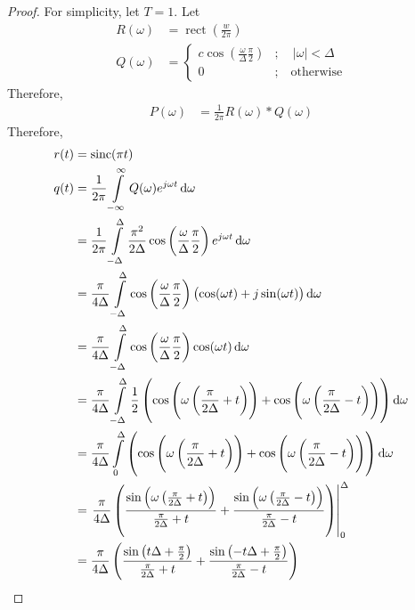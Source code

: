 \documentclass[titlepage, fleqn, a4paper, 12pt, twoside]{article}
\theoremstyle{definition}
\theoremstyle{theorem}
\DeclareMathOperator{\sinc}{\mathrm{sinc}}
\DeclareMathOperator{\rect}{\mathrm{rect}}
\begin{document}
\begin{proof}
	For simplicity, let $T = 1$.
	Let
	\begin{align*}
		R(\omega) &= \rect\left( \frac{w}{2 \pi} \right)\\
		Q(\omega) &=
			\begin{cases}
				c \cos\left( \frac{\omega}{\Delta} \frac{\pi}{2} \right) &;\quad |\omega| < \Delta\\
				0 &;\quad \text{otherwise}
			\end{cases}
	\end{align*}
	Therefore,
	\begin{align*}
		P(\omega) &= \frac{1}{2 \pi} R(\omega) \ast Q(\omega)
	\end{align*}
	Therefore,
	\begin{align*}
		r(t) &= \sinc(\pi t)\\
		q(t) &= \frac{1}{2 \pi} \int\limits_{-\infty}^{\infty} Q(\omega) e^{j \omega t} \dif \omega\\
		&= \frac{1}{2 \pi} \int\limits_{-\Delta}^{\Delta} \frac{\pi^2}{2 \Delta} \cos\left( \frac{\omega}{\Delta} \frac{\pi}{2} \right) e^{j \omega t} \dif \omega\\
		&= \frac{\pi}{4 \Delta} \int\limits_{-\Delta}^{\Delta} \cos\left( \frac{\omega}{\Delta} \frac{\pi}{2} \right) \left( \cos(\omega t) + j \sin(\omega t) \right) \dif \omega\\
		&= \frac{\pi}{4 \Delta} \int\limits_{-\Delta}^{\Delta} \cos\left( \frac{\omega}{\Delta} \frac{\pi}{2} \right) \cos(\omega t) \dif \omega\\
		&= \frac{\pi}{4 \Delta} \int\limits_{-\Delta}^{\Delta} \frac{1}{2} \left( \cos\left( \omega \left( \frac{\pi}{2 \Delta} + t \right) \right) + \cos\left( \omega \left( \frac{\pi}{2 \Delta} - t \right) \right) \right) \dif \omega\\
		&= \frac{\pi}{4 \Delta} \int\limits_{0}^{\Delta} \left( \cos\left( \omega \left( \frac{\pi}{2 \Delta} + t \right) \right) + \cos\left( \omega \left( \frac{\pi}{2 \Delta} - t \right) \right) \right) \dif \omega\\
		&= \left. \frac{\pi}{4 \Delta} \left( \frac{\sin\left( \omega \left( \frac{\pi}{2 \Delta} + t \right) \right)}{\frac{\pi}{2 \Delta} + t} + \frac{\sin\left( \omega \left( \frac{\pi}{2 \Delta} - t \right) \right)}{\frac{\pi}{2 \Delta} - t} \right) \right|_{0}^{\Delta}\\
		&= \frac{\pi}{4 \Delta} \left( \frac{\sin\left( t \Delta + \frac{\pi}{2} \right)}{\frac{\pi}{2 \Delta} + t} + \frac{\sin\left( -t \Delta + \frac{\pi}{2} \right)}{\frac{\pi}{2 \Delta} - t} \right)\\

\end{align*}
\end{proof}
\end{document}

